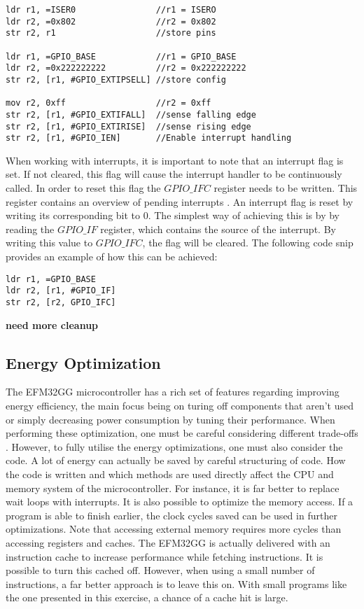 \begin{lstlisting}
ldr r1, =ISER0                //r1 = ISERO
ldr r2, =0x802                //r2 = 0x802  
str r2, r1                    //store pins

ldr r1, =GPIO_BASE            //r1 = GPIO_BASE
ldr r2, =0x222222222          //r2 = 0x222222222
str r2, [r1, #GPIO_EXTIPSELL] //store config

mov r2, 0xff                  //r2 = 0xff 
str r2, [r1, #GPIO_EXTIFALL]  //sense falling edge
str r2, [r1, #GPIO_EXTIRISE]  //sense rising edge
str r2, [r1, #GPIO_IEN]       //Enable interrupt handling 

\end{lstlisting}

When working with interrupts, it is important to note that an interrupt flag is set. If not cleared, this flag will cause the interrupt handler to be continuously called. In order to reset this flag the $GPIO\_IFC$ register needs to be written. This register contains an overview of pending interrupts \cite[p. 763]{EFM32GG-rm}. An interrupt flag is reset by writing its corresponding bit to 0.  The simplest way of achieving this is by by reading the $GPIO\_IF$ register, which contains the source of the interrupt. By writing this value to $GPIO\_IFC$, the flag will be cleared. The following code snip provides an example of how this can be achieved:

\begin{lstlisting}
ldr r1, =GPIO_BASE
ldr r2, [r1, #GPIO_IF]
str r2, [r2, GPIO_IFC]
\end{lstlisting}
 
{\bf need more cleanup}


\subsection{Energy Optimization}\label{ch:energy_optimization} 
The EFM32GG microcontroller has a rich set of features regarding improving energy efficiency, the main focus being on turing off components that aren't used or simply decreasing power consumption by tuning their performance. When performing these optimization, one must be careful considering different trade-offs \cite{EFM32GG-energy}. However, to fully utilise the energy optimizations, one must also consider the code. A lot of energy can actually be saved by careful structuring of code. How the code is written and which methods are used directly affect the CPU and memory system of the microcontroller. For instance, it is far better to replace wait loops with interrupts. It is also possible to optimize the memory access. If a program is able to finish earlier, the clock cycles saved can be used in further optimizations. Note that accessing external memory requires more cycles than accessing registers and caches. The EFM32GG is actually delivered with an instruction cache to increase performance while fetching instructions. It is possible to turn this cached off. However, when using a small number of instructions, a far better approach is to leave this on. With small programs like the one presented in this exercise, a chance of a cache hit is large.

